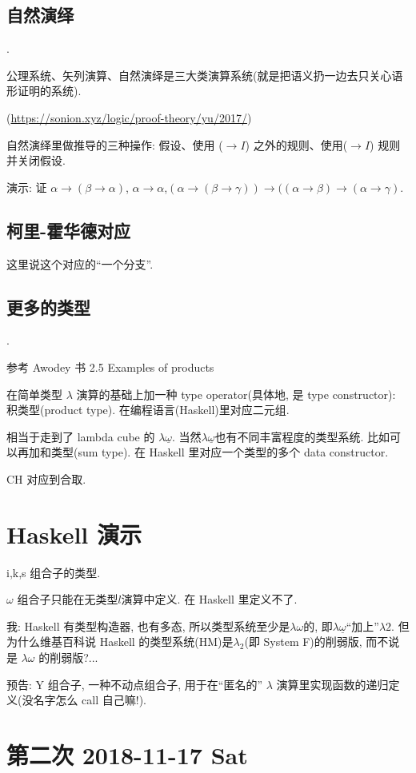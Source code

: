 \documentclass{article}
\def\a{\alpha}
\def\b{\beta}
\def\c{\gamma}
\def\l{\lambda}
\begin{document}
\subsection{自然演绎}
.

公理系统、矢列演算、自然演绎是三大类演算系统(就是把语义扔一边去只关心语形证明的系统).

(\url{https://sonion.xyz/logic/proof-theory/yu/2017/})

自然演绎里做推导的三种操作: 假设、使用 ($\to I$) 之外的规则、使用($\to I$) 规则并关闭假设.

演示: 证 $\a\to(\b\to\a)$, $\a\to\a$,$(\a\to(\b\to\c))\to((\a\to\b)\to(\a\to\c)$.

\subsection{柯里-霍华德对应}

这里说这个对应的``一个分支''.


\subsection{更多的类型}
.

参考 Awodey 书 2.5 Examples of products

在简单类型 $\l$ 演算的基础上加一种 type operator(具体地, 是 type constructor): 积类型(product type). 在编程语言(Haskell)里对应二元组.

相当于走到了 lambda cube 的 $\l \underline{\omega}$. 当然$\l \underline{\omega}$也有不同丰富程度的类型系统. 比如可以再加和类型(sum type). 在 Haskell 里对应一个类型的多个 data constructor.

CH 对应到合取.

\section{Haskell 演示}

i,k,s 组合子的类型.

$\omega$ 组合子只能在无类型$l$演算中定义. 在 Haskell 里定义不了.

我: Haskell 有类型构造器, 也有多态, 所以类型系统至少是$\l \omega$的, 即$\l \underline{\omega}$``加上''$\l 2$. 但为什么维基百科说 Haskell 的类型系统(HM)是$\l_2$(即 System F)的削弱版, 而不说是 $\l \omega$ 的削弱版?...

预告: Y 组合子, 一种不动点组合子, 用于在``匿名的'' $\l$ 演算里实现函数的递归定义(没名字怎么 call 自己嘛!).


\section{第二次 2018-11-17 Sat}
\end{document}
